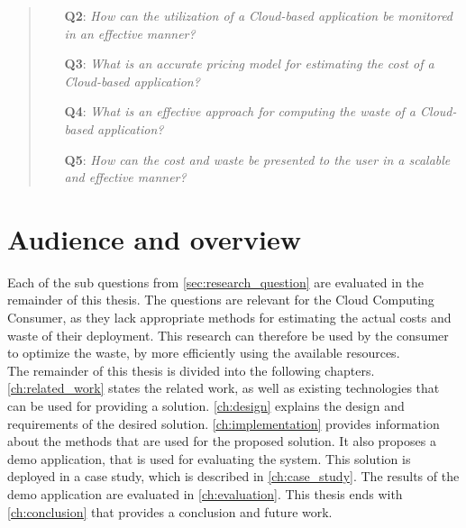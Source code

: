 \begin{quote}
    \begin{itemize}
        \item[\textbf{Q2}: ]\textit{How can the utilization of a Cloud-based application be monitored in an effective manner?}
        \item[\textbf{Q3}: ]\textit{What is an accurate pricing model for estimating the cost of a Cloud-based application?}
        \item[\textbf{Q4}: ]\textit{What is an effective approach for computing the waste of a Cloud-based application?}
        \item[\textbf{Q5}: ]\textit{How can the cost and waste be presented to the user in a scalable and effective manner?}
    \end{itemize}
\end{quote}

\section{Audience and overview} \label{sec:audience}
Each of the sub questions from \autoref{sec:research_question} are evaluated in the remainder of this thesis. The questions are relevant for the Cloud Computing Consumer, as they lack appropriate methods for estimating the actual costs and waste of their deployment. This research can therefore be used by the consumer to optimize the waste, by more efficiently using the available resources. \\

\noindent
The remainder of this thesis is divided into the following chapters. \autoref{ch:related_work} states the related work, as well as existing technologies that can be used for providing a solution. \autoref{ch:design} explains the design and requirements of the desired solution. \autoref{ch:implementation} provides information about the methods that are used for the proposed solution. It also proposes a demo application, that is used for evaluating the system. This solution is deployed in a case study, which is described in \autoref{ch:case_study}.
The results of the demo application are evaluated in \autoref{ch:evaluation}. This thesis ends with \autoref{ch:conclusion} that provides a conclusion and future work.